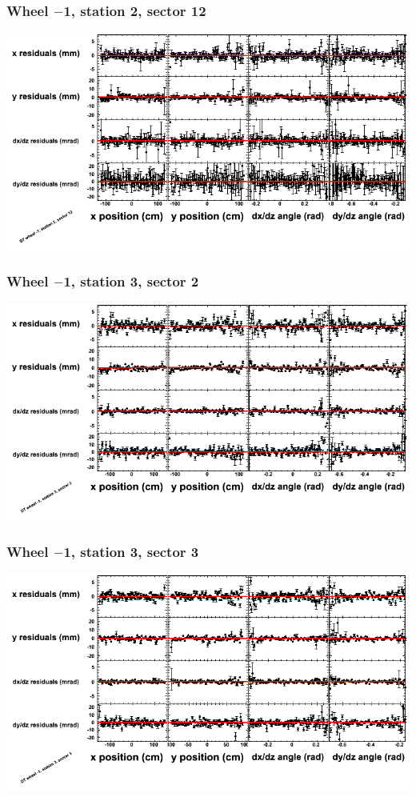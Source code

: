\documentclass[compress]{beamer}
\begin{document}
\begin{frame}
\frametitle{Wheel $-$1, station 2, sector 12}
\includegraphics[width=\linewidth]{tmppoly_MBwhBst2sec12.png}
\end{frame}

\begin{frame}
\frametitle{Wheel $-$1, station 3, sector 2}
\includegraphics[width=\linewidth]{tmppoly_MBwhBst3sec02.png}
\end{frame}

\begin{frame}
\frametitle{Wheel $-$1, station 3, sector 3}
\includegraphics[width=\linewidth]{tmppoly_MBwhBst3sec03.png}
\end{frame}
\end{document}
